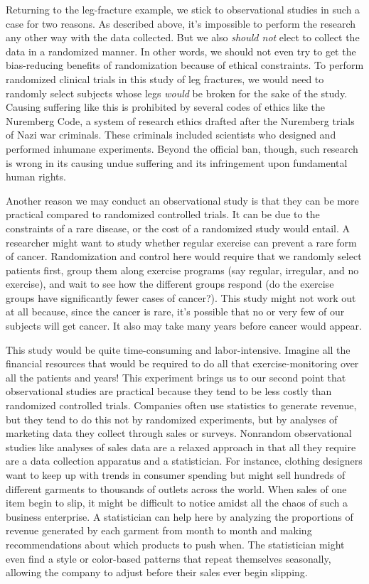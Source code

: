 \documentclass[11pt, chapterprefix=true]{scrbook}\usepackage[]{graphicx}\usepackage[]{color}
\begin{document}
Returning to the leg-fracture example, we stick to observational studies in such a case for two reasons. As described above, it's impossible to perform the research any other way with the data collected. But we also \textit{should not} elect to collect the data in a randomized manner.  In other words, we should not even try to get the bias-reducing benefits of randomization because of ethical constraints. To perform randomized clinical trials in this study of leg fractures, we would need to randomly select subjects whose legs \textit{would} be broken for the sake of the study. Causing suffering like this is prohibited by several codes of ethics like the Nuremberg Code, a system of research ethics drafted after the Nuremberg trials of Nazi war criminals.  These criminals included scientists who designed and performed inhumane experiments. Beyond the official ban, though, such research is wrong in its causing undue suffering and its infringement upon fundamental human rights.

Another reason we may conduct an observational study is that they can be more practical compared to randomized controlled trials. It can be due to the constraints of a rare disease, or the cost of a randomized study would entail.  A researcher might want to study whether regular exercise can prevent a rare form of cancer.  Randomization and control here would require that we randomly select patients first, group them along exercise programs (say regular, irregular, and no exercise), and wait to see how the different groups respond (do the exercise groups have significantly fewer cases of cancer?).  This study might not work out at all because, since the cancer is rare, it's possible that no or very few of our subjects will get cancer.  It also may take many years before cancer would appear.

This study would be quite time-consuming and labor-intensive. Imagine all the financial resources that would be required to do all that exercise-monitoring over all the patients and years! This experiment brings us to our second point that observational studies are practical because they tend to be less costly than randomized controlled trials. Companies often use statistics to generate revenue, but they tend to do this not by randomized experiments, but by analyses of marketing data they collect through sales or surveys. Nonrandom observational studies like analyses of sales data are a relaxed approach in that all they require are a data collection apparatus and a statistician. For instance, clothing designers want to keep up with trends in consumer spending but might sell hundreds of different garments to thousands of outlets across the world. When sales of one item begin to slip, it might be difficult to notice amidst all the chaos of such a business enterprise. A statistician can help here by analyzing the proportions of revenue generated by each garment from month to month and making recommendations about which products to push when. The statistician might even find a style or color-based patterns that repeat themselves seasonally, allowing the company to adjust before their sales ever begin slipping.
\end{document}

